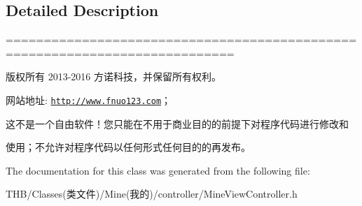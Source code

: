 \subsection{Detailed Description}
============================================================================

版权所有 2013-\/2016 方诺科技，并保留所有权利。

网站地址\+: \href{http://www.fnuo123.com}{\tt http\+://www.\+fnuo123.\+com}； 



这不是一个自由软件！您只能在不用于商业目的的前提下对程序代码进行修改和

使用；不允许对程序代码以任何形式任何目的的再发布。 

 

The documentation for this class was generated from the following file\+:\begin{DoxyCompactItemize}
\item 
T\+H\+B/\+Classes(类文件)/\+Mine(我的)/controller/Mine\+View\+Controller.\+h\end{DoxyCompactItemize}
